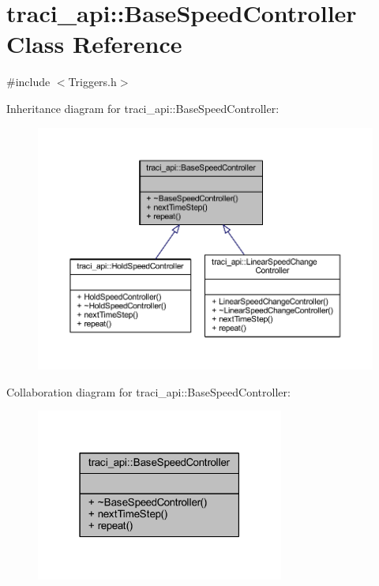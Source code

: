 \hypertarget{classtraci__api_1_1_base_speed_controller}{}\section{traci\+\_\+api\+:\+:Base\+Speed\+Controller Class Reference}
\label{classtraci__api_1_1_base_speed_controller}


{\ttfamily \#include $<$Triggers.\+h$>$}



Inheritance diagram for traci\+\_\+api\+:\+:Base\+Speed\+Controller\+:
\nopagebreak
\begin{figure}[H]
\begin{center}
\leavevmode
\includegraphics[width=350pt]{classtraci__api_1_1_base_speed_controller__inherit__graph}
\end{center}
\end{figure}


Collaboration diagram for traci\+\_\+api\+:\+:Base\+Speed\+Controller\+:
\nopagebreak
\begin{figure}[H]
\begin{center}
\leavevmode
\includegraphics[width=231pt]{classtraci__api_1_1_base_speed_controller__coll__graph}
\end{center}
\end{figure}
